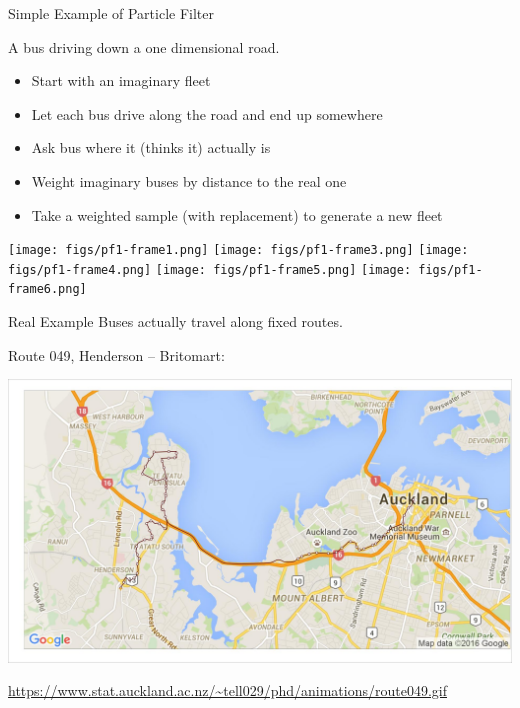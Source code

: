 \documentclass[10pt,t]{beamer}
\begin{document}
\begin{frame}{Simple Example of Particle Filter}

  A bus driving down a one dimensional road.
  \onslide<+->

  \begin{itemize}[<+- | alert@+>]
  \item Start with an imaginary fleet
  \item Let each bus drive along the road and end up somewhere
  \item Ask bus where it (thinks it) actually is
  \item Weight imaginary buses by distance to the real one
  \item Take a weighted sample (with replacement) to generate a new fleet
  \end{itemize}
  
  \begin{overprint}
    \centering
    \texttt{[image: figs/pf1-frame1.png]}
    \centering
    \texttt{[image: figs/pf1-frame3.png]}
    \centering
    \texttt{[image: figs/pf1-frame4.png]}
    \centering
    \texttt{[image: figs/pf1-frame5.png]}
    \centering
    \texttt{[image: figs/pf1-frame6.png]}
  \end{overprint}

  \onslide<+->
\end{frame}


\begin{frame}{Real Example}
  Buses actually travel along fixed routes.
  
  Route 049, Henderson -- Britomart:
  
  {\centering
  \includegraphics[width=\textwidth]{pf/particle_map001.jpg}}

  \footnotesize\url{https://www.stat.auckland.ac.nz/~tell029/phd/animations/route049.gif}

\end{frame}
\end{document}
